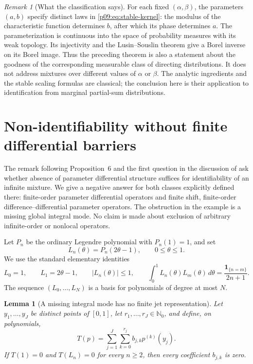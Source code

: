 \documentclass[11pt,letterpaper]{article}
\newtheorem{lemma}[theorem]{Lemma}
\theoremstyle{definition}
\theoremstyle{remark}
\newtheorem{remark}[theorem]{Remark}
\newcommand{\1}{\mathbf 1}
\begin{document}
\begin{remark}[What the classification says]
For each fixed $(\alpha,\beta)$, the parameters $(a,b)$ specify distinct
laws in \eqref{p09:eq:stable-kernel}: the modulus of the characteristic
function determines $b$, after which its phase determines $a$.
The parameterization is continuous into the space of probability measures
with its weak topology.  Its injectivity and the Lusin--Souslin theorem
give a Borel inverse on its Borel image.  Thus the preceding theorem is
also a statement about the goodness of the corresponding measurable
class of directing distributions.
It does not address mixtures over different values of $\alpha$ or $\beta$.
The analytic ingredients and the stable scaling formulas are classical;
the conclusion here is their application to identification from marginal
partial-sum distributions.
\end{remark}




\section{Non-identifiability without finite differential barriers}
\label{p09:sec:no-differential-barrier}

The remark following Proposition~6 and the first question in the
discussion of \cite{LeBarilettoRinaldoHo2026} ask whether absence of
parameter differential structure suffices for identifiability of an
infinite mixture.  We give a negative answer for both classes explicitly
defined there: finite-order parameter differential operators and finite
shift, finite-order difference--differential parameter operators.  The
obstruction in the example is a missing global integral mode.  No claim
is made about exclusion of arbitrary infinite-order or nonlocal
operators.

Let $P_n$ be the ordinary Legendre polynomial with $P_n(1)=1$, and set
\[
 L_n(\theta)=P_n(2\theta-1),\qquad 0\le\theta\le1.
\]
We use the standard elementary identities
\begin{equation}
 L_0=1,\qquad L_1=2\theta-1,\qquad |L_n(\theta)|\le1,
 \qquad
 \int_0^1 L_n(\theta)L_m(\theta)\,d\theta
       =\frac{\mathbf1_{\{n=m\}}}{2n+1}.
 \label{p09:eq:legendre-orthogonality}
\end{equation}
The sequence $(L_0,\ldots,L_N)$ is a basis for polynomials of degree at
most $N$.

\begin{lemma}[A missing integral mode has no finite jet representation]
\label{p09:lem:no-finite-jet}
Let $y_1,\ldots,y_J$ be distinct points of $[0,1]$, let
$r_1,\ldots,r_J\in\mathbb N_0$, and define, on polynomials,
\[
 T(p)=\sum_{j=1}^J\sum_{k=0}^{r_j} b_{j,k}p^{(k)}(y_j).
\]
If $T(1)=0$ and $T(L_n)=0$ for every $n\ge2$, then every coefficient
$b_{j,k}$ is zero.
\end{lemma}
\end{document}
